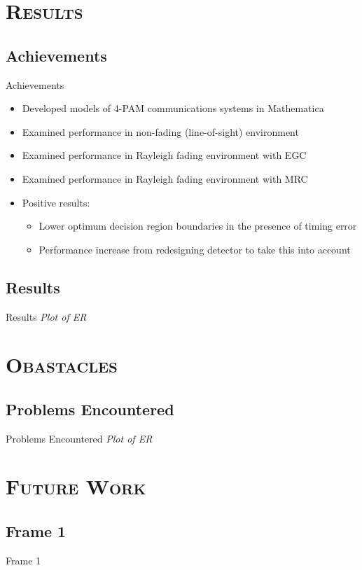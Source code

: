\documentclass[xcolor=x11names,compress]{beamer}
\renewcommand{\(}{\begin{columns}}
\renewcommand{\)}{\end{columns}}
\newcommand{\<}[1]{\begin{column}{#1}}
\renewcommand{\>}{\end{column}}
\begin{document}
\section{\scshape Results}
\subsection{Achievements}
\begin{frame}{Achievements}
\begin{itemize}
\item Developed models of 4-PAM communications systems in Mathematica
\item Examined performance in non-fading (line-of-sight) environment
\item Examined performance in Rayleigh fading environment with EGC
\item Examined performance in Rayleigh fading environment with MRC
\item Positive results:
	\begin{itemize}
	\item Lower optimum decision region boundaries in the presence of timing error
	\item Performance increase from redesigning detector to take this into account
	\end{itemize}
\end{itemize}
\end{frame}

\subsection{Results}
\begin{frame}{Results}
\emph{Plot of ER}
\end{frame}

\section{\scshape Obastacles}
\subsection{Problems Encountered}
\begin{frame}{Problems Encountered}
\emph{Plot of ER}
\end{frame}

\section{\scshape Future Work}
\subsection{Frame 1}
\begin{frame}{Frame 1}

\end{frame}
\end{document}
